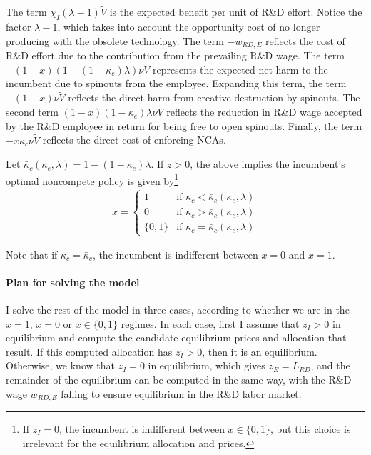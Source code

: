 \documentclass[11pt,english]{article}
\theoremstyle{remark}
\begin{document}
The term $\chi_I(\lambda -1) \tilde{V}$ is the expected benefit per unit of R\&D effort. Notice the factor $\lambda -1$, which takes into account the opportunity cost of no longer producing with the obsolete technology. The term $-w_{RD,E}$ reflects the cost of R\&D effort due to the contribution from the prevailing R\&D wage. The term $-(1-x)(1 - (1-\kappa_e) \lambda) \nu \tilde{V}$ represents the expected net harm to the incumbent due to spinouts from the employee. Expanding this term, the term $-(1-x)\nu \tilde{V}$ reflects the direct harm from creative destruction by spinouts. The second term $(1-x)(1-\kappa_e)\lambda \nu \tilde{V}$ reflects the reduction in R\&D wage accepted by the R\&D employee in return for being free to open spinouts. Finally, the term $-x \kappa_c \nu \tilde{V}$ reflects the direct cost of enforcing NCAs.

Let $\bar{\kappa}_c (\kappa_e, \lambda) = 1 - (1-\kappa_e)\lambda$. If $z > 0$, the above implies the incumbent's optimal noncompete policy is given by\footnote{If $z_I = 0$, the incumbent is indifferent between $x \in\{0,1\}$, but this choice is irrelevant for the equilibrium allocation and prices.} 
\begin{align}
x = \begin{cases}
1 & \textrm{if } \kappa_{c} < \bar{\kappa}_c (\kappa_e, \lambda) \\
0 & \textrm{if } \kappa_{c} > \bar{\kappa}_c (\kappa_e, \lambda)\\
\{0,1\} & \textrm{if } \kappa_c = \bar{\kappa}_c (\kappa_e, \lambda) 
\end{cases} \label{eq_nca_policy}
\end{align}

Note that if $\kappa_c = \bar{\kappa}_c$, the incumbent is indifferent between $x = 0$ and $x = 1$.

\paragraph{Plan for solving the model}

I solve the rest of the model in three cases, according to whether we are in the $x = 1$, $x = 0$ or $x \in \{0,1\}$ regimes. In each case, first I assume that $z_I > 0$ in equilibrium and compute the candidate equilibrium prices and allocation that result. If this computed allocation has $z_I > 0$, then it is an equilibrium. Otherwise, we know that $z_I = 0$ in equilibrium, which gives $z_E = \bar{L}_{RD}$, and the remainder of the equilibrium can be computed in the same way, with the R\&D wage $w_{RD,E}$ falling to ensure equilibrium in the R\&D labor market. 
\end{document}
